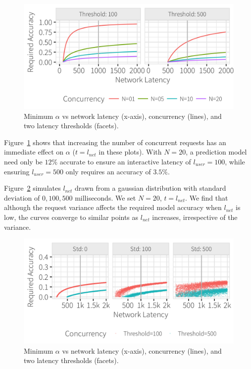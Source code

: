 \begin{figure}[h]
	\centering
	\includegraphics[width=1\columnwidth]{figures/model_concurrency}
 	\caption{Minimum $\alpha$ vs network latency (x-axis), concurrency (lines), and two latency thresholds (facets).}
  \label{fig:model_concurrency}
\end{figure}


Figure~\ref{fig:model_concurrency} shows that increasing the number of concurrent requests has an immediate effect on $\alpha$ ($t=l_{net}$ in these plots).    With $N=20$, a prediction model need only be $12\%$ accurate to ensure an interactive latency of $l_{user}=100$, while ensuring  $l_{user}=500$ only requires an accuracy of $3.5\%$. 


Figure~\ref{fig:model_std} simulates $l_{net}$ drawn from a gaussian distribution with standard deviation of $0, 100, 500$ milliseconds.  We set $N=20$, $t=l_{net}$.  We find that although the request variance affects the required model accuracy when $l_{net}$ is low, the curves converge to similar points as $l_{net}$ increases, irrespective of the variance.

\begin{figure}[h]
	\centering
	\includegraphics[width=1\columnwidth]{figures/model_std}
 	\caption{Minimum $\alpha$ vs network latency (x-axis), concurrency (lines), and two latency thresholds (facets).}
  \label{fig:model_std}
\end{figure}

